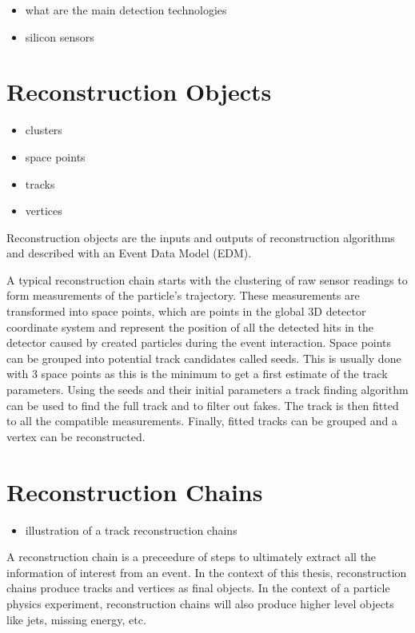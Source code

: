 \begin{itemize}
    \color{red}
    \item what are the main detection technologies
    \item silicon sensors
\end{itemize}

\section{Reconstruction Objects}

\begin{itemize}
    \color{red}
    \item clusters
    \item space points
    \item tracks
    \item vertices
\end{itemize}

Reconstruction objects are the inputs and outputs of reconstruction algorithms and described with an Event Data Model (EDM).

A typical reconstruction chain starts with the clustering of raw sensor readings to form measurements of the particle's trajectory. These measurements are transformed into space points, which are points in the global 3D detector coordinate system and represent the position of all the detected hits in the detector caused by created particles during the event interaction. Space points can be grouped into potential track candidates called seeds. This is usually done with 3 space points as this is the minimum to get a first estimate of the track parameters. Using the seeds and their initial parameters a track finding algorithm can be used to find the full track and to filter out fakes. The track is then fitted to all the compatible measurements. Finally, fitted tracks can be grouped and a vertex can be reconstructed.

\section{Reconstruction Chains}

\begin{itemize}
    \color{red}
    \item illustration of a track reconstruction chains
\end{itemize}

A reconstruction chain is a preceedure of steps to ultimately extract all the information of interest from an event. In the context of this thesis, reconstruction chains produce tracks and vertices as final objects. In the context of a particle physics experiment, reconstruction chains will also produce higher level objects like jets, missing energy, etc.

